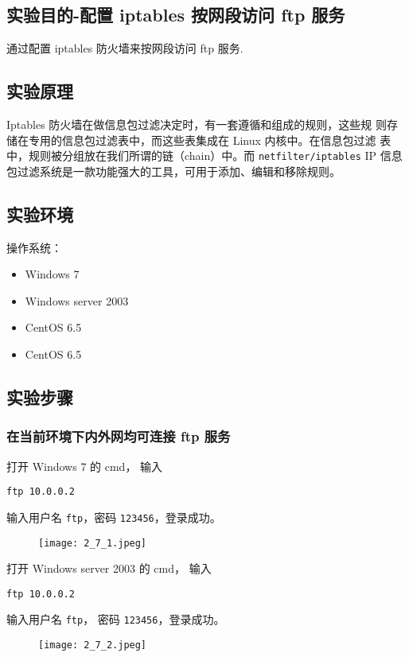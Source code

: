 \subsection{实验目的-配置 iptables 按网段访问 ftp 服务}
通过配置 iptables 防火墙来按网段访问 ftp 服务.
%
\subsection{实验原理}
Iptables 防火墙在做信息包过滤决定时，有一套遵循和组成的规则，这些规
则存储在专用的信息包过滤表中，而这些表集成在 Linux 内核中。在信息包过滤
表中，规则被分组放在我们所谓的链（chain）中。而 \texttt{netfilter/iptables} IP
信息包过滤系统是一款功能强大的工具，可用于添加、编辑和移除规则。
%
\subsection{实验环境}
操作系统：
\begin{itemize}
  \item Windows 7
  \item Windows server 2003
  \item CentOS 6.5
  \item CentOS 6.5
\end{itemize}
%
\subsection{实验步骤}
\subsubsection{在当前环境下内外网均可连接 ftp 服务}
打开 Windows 7 的 cmd，
输入
\begin{verbatim}
ftp 10.0.0.2
\end{verbatim}
输入用户名 \texttt{ftp}，密码 \texttt{123456}，登录成功。
\begin{figure}[H]
  \begin{center}
    \texttt{[image: 2\_7\_1.jpeg]}
  \end{center}
\end{figure}

打开 Windows server 2003 的 cmd，
输入
\begin{verbatim}
ftp 10.0.0.2
\end{verbatim}
输入用户名 \texttt{ftp}，
密码 \texttt{123456}，登录成功。
\begin{figure}[H]
  \begin{center}
    \texttt{[image: 2\_7\_2.jpeg]}
  \end{center}
\end{figure}
%
